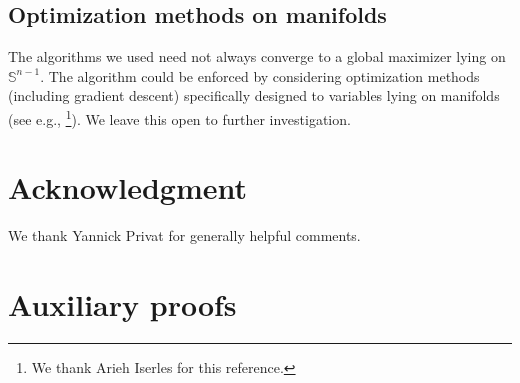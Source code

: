 \documentclass[journal,twoside,web]{ieeecolor}
\begin{document}
	\subsection{Optimization methods on manifolds}
	
	The algorithms we used need not always converge to a global maximizer lying on $\mathbb{S}^{n-1}$. The algorithm could be enforced by considering optimization methods (including gradient descent) specifically designed to variables lying on manifolds (see e.g., \cite{boumal2020introduction}\footnote{We thank Arieh Iserles for this reference.}). We leave this open to further investigation. 
	
	\section*{Acknowledgment} We thank Yannick Privat for generally helpful comments.

\appendix
	
	\section{Auxiliary proofs}
	
\end{document}
